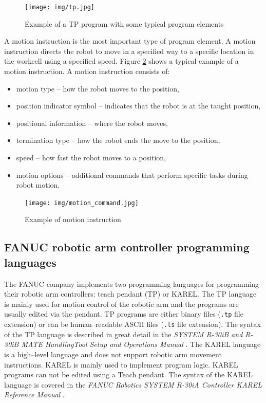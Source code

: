 \begin{figure}[h]
    \centering
    \texttt{[image: img/tp.jpg]}
    \caption{Example of a TP program with some typical program elements \cite{fanuchandling}}
    \label{fig:tp}
\end{figure}

A motion instruction is the most important type of program element. A motion instruction directs the robot to move in a specified way to a specific location in the workcell
using a specified speed. Figure \ref{fig:motion} shows a typical example of a motion instruction. A motion instruction consists of:

\begin{itemize}

\item motion type -- how the robot moves to the position,
\item position indicator symbol -- indicates that the robot is at the taught position,
\item positional information -- where the robot moves,
\item termination type -- how the robot ends the move to the position,
\item speed -- how fast the robot moves to a position,
\item motion options -- additional commands that perform specific tasks during robot motion.

\end{itemize}

\begin{figure}[h]
    \centering
    \texttt{[image: img/motion\_command.jpg]}
    \caption{Example of motion instruction \cite{fanuchandling}}
    \label{fig:motion}
\end{figure}

\subsection{FANUC robotic arm controller programming languages}

The FANUC company implements two programming languages for programming their robotic arm controllers: teach pendant (TP) or KAREL. The TP language is mainly used for motion control of the robotic arm and the programs are usually edited via the pendant. TP programs are either binary files (\texttt{.tp} file extension) or can be human--readable ASCII files (\texttt{.ls} file extension). The syntax of the TP language is described in great detail in the \emph{SYSTEM R-30iB and R-30iB MATE HandlingTool Setup and Operations Manual} \cite{fanuchandling}. The KAREL language is a high--level language and does not support robotic arm movement instructions. KAREL is mainly used to implement program logic. KAREL programs can not be edited using a Teach pendant. The syntax of the KAREL language is covered in the \emph{FANUC Robotics SYSTEM R-30iA Controller KAREL Reference Manual} \cite{karelmanual}.


